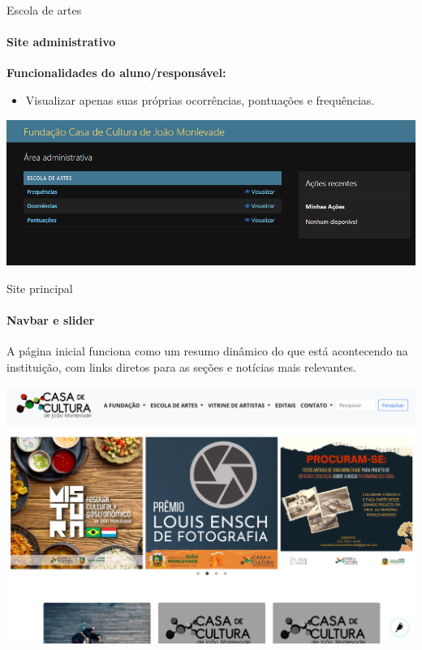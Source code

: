 \begin{frame}{Escola de artes}
    \framesubtitle{Site administrativo}
    \textbf{Funcionalidades do aluno/responsável:}

    \begin{itemize}
        \item Visualizar apenas suas próprias ocorrências, pontuações e frequências.
    \end{itemize}

    \vspace{\baselineskip}
        
    \begin{center}
        \includegraphics[scale=0.4]{beamerthemesrc/assets/admin_aluno.png}
    \end{center}
\end{frame}

\begin{frame}{Site principal}
\framesubtitle{Navbar e slider}
A página inicial funciona
como um resumo dinâmico do que está acontecendo na instituição, com links diretos para
as seções e notícias mais relevantes.

\vspace{\baselineskip}

    \begin{center}
        \includegraphics[width=\textwidth]{beamerthemesrc/assets/pagina_principal.png}
    \end{center}
\end{frame}

